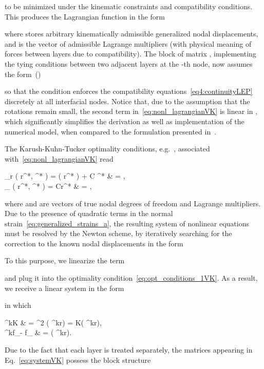 \documentclass[11pt]{article}
\newcommand{\Etot}{\Pi}
\newcommand{\M}[1]{{\boldsymbol #1}}
\newcommand{\Mfint}{\M{f}_\mathrm{int}}
\newcommand{\Mfext}{\M{f}_{\mathrm{ext}}}
\newcommand{\ite}[1]{{^{#1}}}
\newcommand{\Md}{\M{r}}
\newcommand{\MKt}{\M{K}}\newcommand{\Eref}[1]{Eq.~\eqref{#1}}
\newcommand{\step}{k}\clearpage{}
\begin{document}
to be minimized under the kinematic constraints and compatibility
conditions. This produces the Lagrangian function in the form

where  stores arbitrary kinematically admissible generalized nodal displacements, and  is the vector of admissible Lagrange
multipliers (with physical meaning of forces between layers due to compatibility).
The block of matrix , implementing the tying conditions between two adjacent layers at the -th node, now assumes the form~()

so that the condition 
enforces the compatibility equations~\eqref{eq4:continuityLEP} discretely at all interfacial nodes. 
Notice that, due to the assumption that the rotations  remain small, the second term in~\eqref{eq:nonl_lagrangianVK} is linear in , which significantly simplifies the derivation as well as implementation of the numerical model, when compared to the formulation presented in~\cite{Zemanova:2014:NMFS}. 

The Karush-Kuhn-Tucker optimality conditions, e.g.~\cite[Chapter~14]{Bonnans:2003:NOTPA}, associated with~\eqref{eq:nonl_lagrangianVK} read

\nabla_{\Md} 
\left( 
 \Md^*, \M{\lambda}^* 
\right)
=  
\nabla \Etot( \Md^* )
+ 
\M{C}\trn 	
\M{\lambda}^*
& =  
\M{0},
\label{eq:opt_conditions_1VK}
\\
\nabla_{\M{\lambda}} 
\left( 
 \Md^*, \M{\lambda}^* 
\right)
=
\M{C}\Md^*
& =  
\M{0},
\label{eq:opt_conditions_2VK}

where  and  are vectors of true nodal degrees of freedom and Lagrange multipliers. 
Due to the presence of quadratic terms in the normal strain~\eqref{eq:generalized_strains_a}, the
resulting system of nonlinear equations must be resolved by the Newton scheme, by
iteratively searching for the correction  to the known
nodal displacements  in the form

To this purpose, we linearize the term

and plug it into the optimality condition~\eqref{eq:opt_conditions_1VK}. As a
result, we receive a linear system in the form

in which 

\ite{\step}\M{K} 
& =  
\nabla^2 \Etot( \ite{\step}\Md )
=
\MKt( \ite{\step}\Md ),
\\
\ite{\step}\Mfint - \Mfext
& =  
\nabla \Etot( \ite{\step}\Md ).

Due to the fact that each layer is treated separately, the matrices appearing in
Eq.~\eqref{eq:systemVK} possess the block structure
\end{document}
